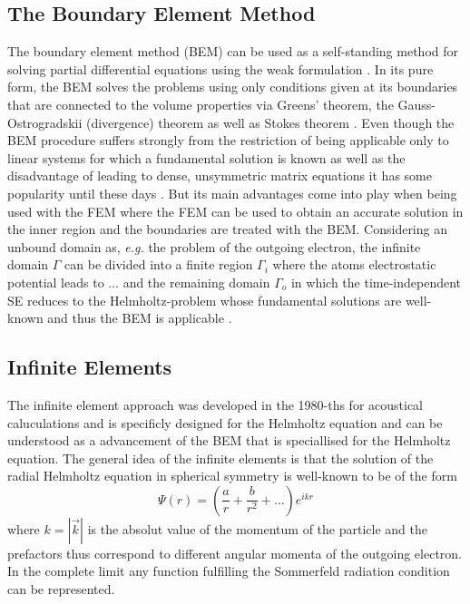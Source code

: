 \subsection{The Boundary Element Method}
The boundary element method (BEM) can be used as a self-standing method for solving partial differential equations using the weak formulation \cite{bemDai,bemCostabel}.
In its pure form, the BEM solves the problems using only conditions given at its boundaries that are connected to the volume properties via Greens' theorem, the Gauss-Ostrogradskii (divergence) theorem as well as Stokes theorem \cite{bemBook}.
Even though the BEM procedure suffers strongly from the restriction of being applicable only to linear systems for which a fundamental solution is known as well as the disadvantage of leading to dense, unsymmetric matrix equations \cite{bemCostabel} it has some popularity until these days \cite{bem1,bem2,bem3}.
But its main advantages come into play when being used with the FEM \cite{bem-fem} where the FEM can be used to obtain an accurate solution in the inner region and the boundaries are treated with the BEM.
Considering an unbound domain as, \textit{e.g.} the problem of the outgoing electron, the infinite domain $\Gamma$ can be divided into a finite region $\Gamma_i$ where the atoms electrostatic potential leads to ... and the remaining domain $\Gamma_o$ in which the time-independent SE reduces to the Helmholtz-problem whose fundamental solutions are well-known and thus the BEM is applicable \cite{bemCostabel, bettessBEM}.

\subsection{Infinite Elements}
The infinite element approach was developed in the 1980-ths for acoustical caluculations and is specificly designed for the Helmholtz equation and can be understood as a advancement of the BEM that is speciallised for the Helmholtz equation.
The general idea of the infinite elements is that the solution of the radial Helmholtz equation in spherical symmetry is well-known to be of the form
\begin{equation} \label{eq:infAnsatz}
 \Psi(r) = \left(\frac ar +\frac{b}{r^2} + \hdots \right) e^{ikr}
\end{equation}
where $k=|\vec{k}|$ is the absolut value of the momentum of the particle and the prefactors thus correspond to different angular momenta of the outgoing electron.
In the complete limit any function fulfilling the Sommerfeld radiation condition \cite{sommerfeldCond} can be represented.

